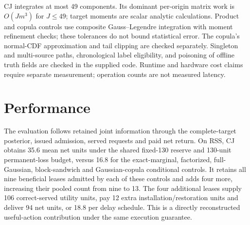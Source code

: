 \documentclass[10pt]{article}
\begin{document}
CJ integrates at most 49 components. Its dominant per-origin matrix
work is $O(Jm^3)$ for $J\leq49$; target moments are scalar analytic
calculations. Product and copula controls use composite Gauss--Legendre
integration with moment refinement checks; these tolerances do not bound
statistical error. The copula's normal-CDF approximation and tail clipping
are checked separately. Singleton and multi-source paths, chronological
label eligibility, and poisoning of offline truth fields are checked in
the supplied code. Runtime and hardware cost claims require separate
measurement; operation counts are not measured latency.

\section{Performance}
\label{sec:performance}

The evaluation follows retained joint information through the complete-target
posterior, issued admission, served requests and paid net return. On RSS,
CJ obtains 35.6 mean net units under the shared fixed-130 reserve and
130-unit permanent-loss budget, versus 16.8 for the exact-marginal,
factorized, full-Gaussian, block-sandwich and Gaussian-copula conditional
controls. It retains all nine beneficial leases admitted by each of these
controls and adds four more, increasing their pooled count from nine to
13. The four additional leases supply 106 correct-served utility units,
pay 12 extra installation/restoration units and deliver 94 net units,
or 18.8 per delay schedule. This is a directly reconstructed useful-action
contribution under the same execution guarantee.
\end{document}
